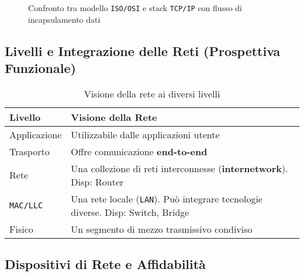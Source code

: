 \begin{figure}[H]
\caption{Confronto tra modello \texttt{ISO/OSI} e stack \texttt{TCP/IP} con flusso di incapsulamento dati}
\end{figure}

\subsection{Livelli e Integrazione delle Reti (Prospettiva Funzionale)}

\begin{table}[H]
\centering
\begin{tabular}{|p{3cm}|p{12cm}|}
\hline
\rowcolor{bg_custom} \textbf{Livello} & \textbf{Visione della Rete} \\
\hline
Applicazione & Utilizzabile dalle applicazioni utente \\
\hline
Trasporto & Offre comunicazione \textbf{end-to-end} \\
\hline
Rete & Una collezione di reti interconnesse (\textbf{internetwork}). Disp: Router \\
\hline
\texttt{MAC/LLC} & Una rete locale (\texttt{LAN}). Può integrare tecnologie diverse. Disp: Switch, Bridge \\
\hline
Fisico & Un segmento di mezzo trasmissivo condiviso \\
\hline
\end{tabular}
\caption{Visione della rete ai diversi livelli}
\end{table}

\subsection{Dispositivi di Rete e Affidabilità}

